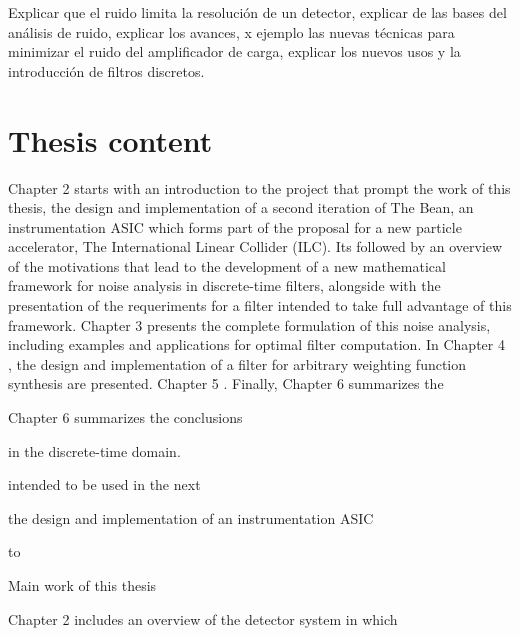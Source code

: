 Explicar que el ruido limita la resolución de un detector, explicar de las bases del análisis de ruido, explicar los avances, x ejemplo las nuevas técnicas para minimizar el ruido del amplificador de carga, explicar los nuevos usos y la introducción de filtros discretos.

\section{Thesis content}
Chapter 2 starts with an introduction to the project that prompt the work of this thesis, the design and implementation of a second iteration of The Bean, an instrumentation ASIC which forms part of the proposal for a new particle accelerator, The International Linear Collider (ILC). Its followed by an overview of the motivations that lead to the development of a new mathematical framework for noise analysis in discrete-time filters, alongside with the presentation of the requeriments for a filter intended to take full advantage of this framework.
Chapter 3 presents the complete formulation of this noise analysis, including examples and applications for optimal filter computation. In Chapter 4 , the design and implementation of a filter for arbitrary weighting function synthesis are presented. Chapter 5 . Finally, Chapter 6 summarizes the 


Chapter 6 summarizes the conclusions 

 in the \mbox{discrete-time} domain.

intended to be used in the next 

the design and implementation of an instrumentation ASIC 


to 

Main work of this thesis 

Chapter 2 includes an overview of the detector system in which 